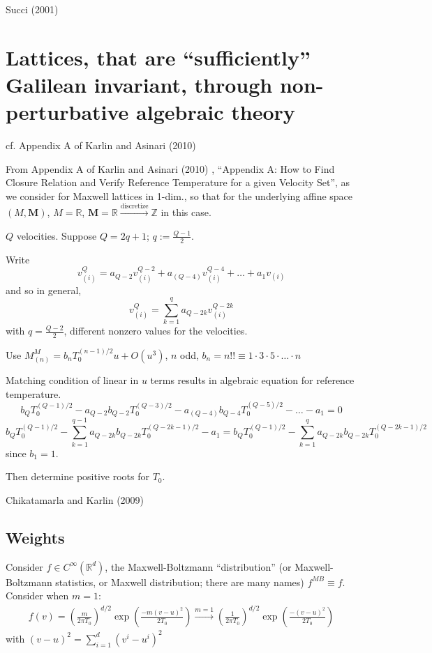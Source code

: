 \documentclass[twoside,landscape,10pt]{amsart}
\theoremstyle{plain}
\theoremstyle{definition}
\theoremstyle{remark}
\theoremstyle{remark}
\begin{document}
\begin{multicols*}{2}
Succi (2001) \cite{Succ2001}


\section{Lattices, that are ``sufficiently'' Galilean invariant, through non-perturbative algebraic theory}



cf. Appendix A of Karlin and Asinari (2010) \cite{KaAs2010}

From Appendix A of Karlin and Asinari (2010) \cite{KaAs2010}, ``Appendix A: How to Find Closure Relation and Verify Reference Temperature for a given Velocity Set'', as we consider for Maxwell lattices in 1-dim., so that for the underlying affine space $(M,\mathbf{M})$, $M=\mathbb{R}$, $\mathbf{M}=\mathbb{R} \xrightarrow{\text{discretize}} \mathbb{Z}$ in this case.

$Q$ velocities.  Suppose $Q = 2q+1$; $q:= \frac{Q-1}{2}$.

Write
\[
v^Q_{(i)} = a_{Q-2}v_{(i)}^{Q-2} + a_{(Q-4)}v_{(i)}^{Q-4} + \dots + a_1 v_{(i)}
\]
and so in general,
\begin{equation}
  v_{(i)}^Q = \sum_{k=1}^q a_{Q-2k} v_{(i)}^{Q-2k}
\end{equation}
with $q = \frac{Q-2}{2}$, different nonzero values for the velocities.

Use $M_{(n)}^M = b_nT_0^{(n-1)/2} u + O(u^3)$, $n$ odd, $b_n=n!! \equiv 1\cdot 3 \cdot 5 \cdot \dots \cdot n$

Matching condition of linear in $u$ terms results in algebraic equation for reference temperature.
\[
b_QT_0^{(Q-1)/2} - a_{Q-2}b_{Q-2} T_0^{(Q-3)/2} - a_{(Q-4)} b_{Q-4} T_0^{(Q-5)/2} - \dots - a_1 = 0
\]
\begin{equation}
  b_QT_0^{(Q-1)/2} - \sum_{k=1}^{q-1} a_{Q-2k} b_{Q-2k} T_0^{(Q-2k-1)/2} - a_1 = b_Q T_0^{(Q-1)/2} - \sum_{k=1}^q a_{Q-2k} b_{Q-2k} T_0^{(Q-2k-1)/2} 
\end{equation}
since $b_1=1$.

Then determine positive roots for $T_0$.  



Chikatamarla and Karlin (2009) \cite{ChKa2009}

\subsection{Weights}

Consider $f\in C^{\infty}(\mathbb{R}^d)$, the Maxwell-Boltzmann ``distribution'' (or Maxwell-Boltzmann statistics, or Maxwell distribution; there are many names) $f^{MB}\equiv f$.  Consider when $m=1$:
\begin{equation}
\begin{gathered}
  f(v) = \left( \frac{m}{2\pi T_0} \right)^{d/2} \exp{ \left( \frac{ -m(v-u)^2 }{ 2T_0} \right) } \xrightarrow{ m=1} \left( \frac{1}{ 2\pi T_0} \right)^{d/2} \exp{ \left( \frac{ -(v-u)^2}{ 2T_0 } \right)} 
  \end{gathered}
\end{equation}
with $(v-u)^2 = \sum_{i=1}^d (v^i-u^i)^2$



\end{multicols*}
\end{document}
